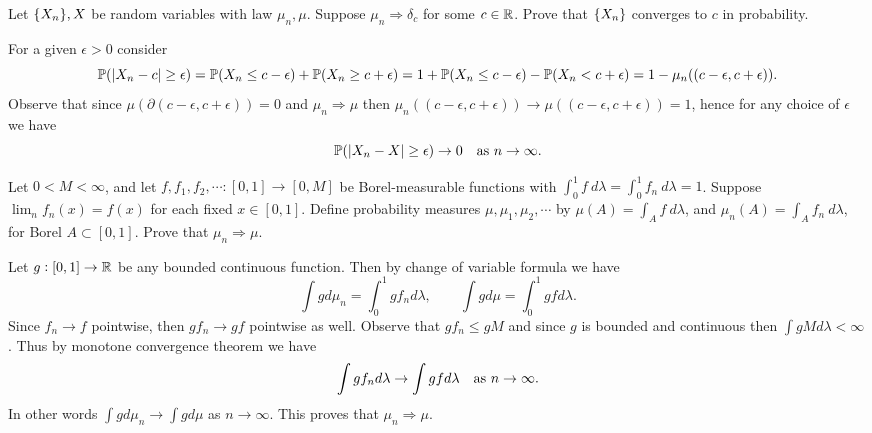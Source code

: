 \begin{problem}
	Let $ \{X_n\}, X $ be random variables with law $ \mu_n, \mu$. Suppose $ \mu_n \Rightarrow \delta_c $ for some $ c \in \mathbb{R} $. Prove that $ \{X_n\} $ converges to $ c $ in probability.
\end{problem}
\begin{solution}
	For a given $ \epsilon>0 $ consider
	\[ \mathbb{P}(|X_n - c| \geq \epsilon) = \mathbb{P}(X_n \leq c - \epsilon) + \mathbb{P}(X_n \geq c + \epsilon) = 1 + \mathbb{P}(X_n \leq c - \epsilon) - \mathbb{P}(X_n < c+\epsilon) = 1 - \mu_n((c-\epsilon,c+\epsilon)).  \]
	Observe that since $ \mu(\partial(c-\epsilon,c+\epsilon)) = 0 $ and $ \mu_n \Rightarrow \mu $  then $ \mu_n((c-\epsilon,c+\epsilon)) \to \mu((c-\epsilon,c+\epsilon)) = 1  $, hence for any choice of $ \epsilon $ we have
	\[ \mathbb{P}(|X_n - X| \geq \epsilon) \to 0 \quad \text{as $ n\to\infty $}. \]
\end{solution}

\begin{problem}
	Let $ 0 < M < \infty $, and let $ f,f_1,f_2,\cdots: [0,1] \to [0,M] $ be Borel-measurable functions with $ \int_{0}^{1}f\ d\lambda = \int_{0}^{1} f_n\ d\lambda = 1 $. Suppose $ \lim_n f_n(x) = f(x) $ for each fixed $ x\in [0,1] $. Define probability  measures $ \mu,\mu_1,\mu_2,\cdots $ by $ \mu(A) = \int_{A} f\ d\lambda $, and $ \mu_n(A) = \int_A f_n\ d\lambda $, for Borel $ A \subset [0,1] $. Prove that $ \mu_n \Rightarrow \mu $.
\end{problem}
\begin{solution}
	Let $ g: [0,1]\to\mathbb{R} $ be any bounded continuous function. Then by change of variable formula we have
	\[ \int g d\mu_n = \int_0^1 g f_n d\lambda, \qquad \int g d\mu = \int_0^1 gf d\lambda. \]
	Since $ f_n \to f $ pointwise, then $ gf_n \to gf $ pointwise as well. Observe that $ gf_n \leq gM $ and since $ g $ is bounded and continuous then $ \int gM d\lambda < \infty $. Thus by monotone convergence theorem we have
	\[ \int {gf_n} {d\lambda} \to \int gf d\lambda \quad \text{as $ n\to\infty $}. \]
	In other words $ \int g d\mu_n \to \int g d\mu $ as $ n\to\infty $. This proves that $ \mu_n \Rightarrow \mu $.
\end{solution}


